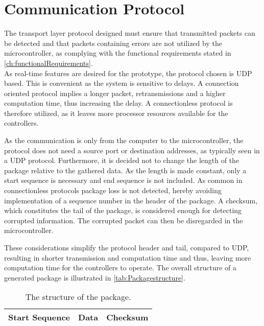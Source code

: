 \section{Communication Protocol}
The transport layer protocol designed must ensure that transmitted packets can be detected and that packets containing errors are not utilized by the microcontroller, as complying with the functional requirements stated in \autoref{ch:functionalRequirements}.\\
%
As real-time features are desired for the prototype, the protocol chosen is UDP based. This is convenient as the system is sensitive to delays. A connection oriented protocol implies a longer packet, retransmissions and a higher computation time, thus increasing the delay. A connectionless protocol is therefore utilized, as it leaves more processor resources available for the controllers.

As the communication is only from the computer to the microcontroller, the protocol does not need a source port or destination addresses, as typically seen in a UDP protocol. Furthermore, it is decided not to change the length of the package relative to the gathered data. As the length is made constant, only a start sequence is necessary and end sequence is not included. As common in connectionless protocols package loss is not detected, hereby avoiding implementation of a sequence number in the header of the package. A checksum, which constitutes the tail of the package, is considered enough for detecting corrupted information. The corrupted packet can then be disregarded in the microcontroller. 

These considerations simplify the protocol header and tail, compared to UDP, resulting in shorter transmission and computation time and thus, leaving more computation time for the controllers to operate. The overall structure of a generated package is illustrated in \autoref{tab:Packagestructure}.
\begin{table}[H]\centering
\begin{tabular}{|>{\centering\arraybackslash}m{3cm}|>{\centering\arraybackslash}m{2cm}|>{\centering\arraybackslash}m{2cm}|}
\hline
Start Sequence & Data & Checksum \\
\hline
\end{tabular}
\caption{The structure of the package.}
\label{tab:Packagestructure}
\end{table}

